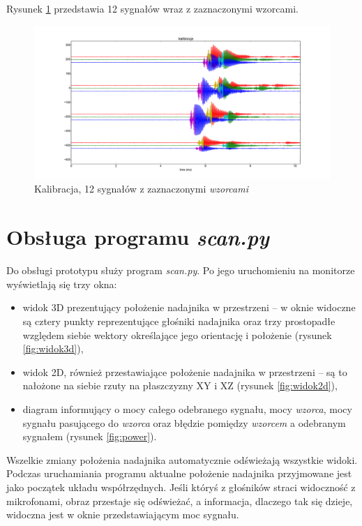 Rysunek \ref{fig:kalibracja_12x} przedstawia 12 sygnałów wraz z zaznaczonymi wzorcami.


 \begin{figure}[h!]
    \centering
    \includegraphics[width=1.12\textwidth, trim= 46mm 0mm 0mm 0mm,clip]{kalibracja_12x}
    \caption{Kalibracja, 12 sygnałów z zaznaczonymi \textit{wzorcami}}
    \label{fig:kalibracja_12x}
\end{figure}

\newpage

\section{Obsługa programu \textit{scan.py}}

Do obsługi prototypu służy program \textit{scan.py}. Po jego uruchomieniu 
na monitorze wyświetlają się trzy okna: 
\begin{itemize}
 \item widok 3D prezentujący położenie nadajnika w przestrzeni -- w oknie widoczne są  
 cztery punkty reprezentujące głośniki nadajnika oraz trzy prostopadłe względem siebie wektory określające 
jego orientację i położenie (rysunek \ref{fig:widok3d}),
 \item widok 2D, również przestawiające położenie nadajnika w przestrzeni --
 są to nałożone na siebie rzuty na płaszczyzny XY i XZ
 (rysunek \ref{fig:widok2d}),
 \item diagram informujący o mocy całego odebranego sygnału, mocy \textit{wzorca}, mocy sygnału pasującego do \textit{wzorca} 
 oraz błędzie pomiędzy \textit{wzorcem} a odebranym sygnałem (rysunek \ref{fig:power}).
\end{itemize}

Wszelkie zmiany położenia nadajnika automatycznie odświeżają wszystkie widoki. 
Podczas uruchamiania programu aktualne położenie nadajnika przyjmowane 
jest jako początek układu współrzędnych.
Jeśli któryś z głośników straci widoczność z mikrofonami, obraz przestaje się odświeżać, a informacja, dlaczego tak
się dzieje, widoczna jest w oknie przedstawiającym moc sygnału.



